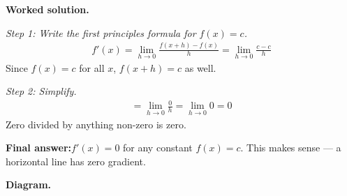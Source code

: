 \documentclass[11pt]{article}
\begin{document}
\textbf{Worked solution.}

\textit{Step 1: Write the first principles formula for \( f(x) = c \).}
\[\begin{gathered}
f'(x) = \lim_{h \to 0} \frac{f(x+h) - f(x)}{h} = \lim_{h \to 0} \frac{c - c}{h}
\end{gathered}\]
Since \( f(x) = c \) for all \( x \), \( f(x+h) = c \) as well.

\textit{Step 2: Simplify.}
\[\begin{gathered}
= \lim_{h \to 0} \frac{0}{h} = \lim_{h \to 0} 0 = 0
\end{gathered}\]
Zero divided by anything non-zero is zero.

\begin{answerbox}
\textbf{Final answer:}\quad \(\displaystyle  f'(x) = 0 \) for any constant \(\displaystyle  f(x) = c \). This makes sense --- a horizontal line has zero gradient.
\end{answerbox}
\textbf{Diagram.}
\end{document}
